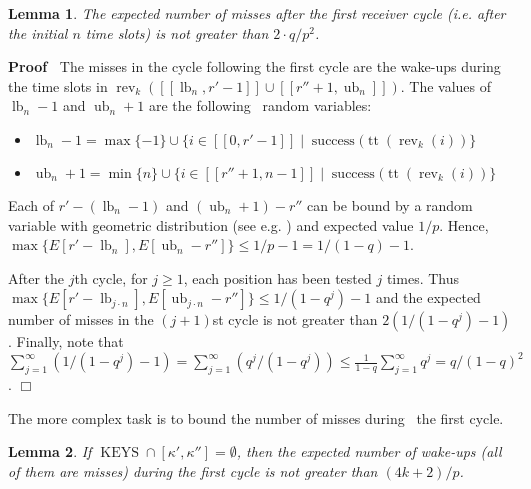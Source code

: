 \documentclass{article}
\newcommand{\tmop}[1]{\ensuremath{\operatorname{#1}}}
\newenvironment{proof}{\noindent\textbf{Proof\ }}{\hspace*{\fill}$\Box$\medskip}
\newtheorem{lemma}{Lemma}
\begin{document}
\begin{lemma}
  \label{Lemma-expected-trailer}The expected number of misses after the first
  receiver cycle (i.e. after the initial $n$ time slots) is not greater than
  $2 \cdot q / p^2$.
\end{lemma}

\begin{proof}
  The misses in the cycle following the first cycle are the wake-ups during
  the time slots in $\tmop{rev}_k ([[\tmop{lb}_n, r' - 1]] \cup [[r'' + 1,
  \tmop{ub}_n]])$. The values of $\tmop{lb}_n - 1$ and $\tmop{ub}_n + 1$ are
  the following \ random variables:
  \begin{itemize}
    \item $\tmop{lb}_n - 1 = \max \{- 1\} \cup \{i \in [[0, r' - 1]] \;|\;
    \tmop{success} (\tmop{tt} (\tmop{rev}_k (i))\}$
    
    \item $\tmop{ub}_n + 1 = \min \{n\} \cup \{i \in [[r'' + 1, n - 1]] \;|\;
    \tmop{success} (\tmop{tt} (\tmop{rev}_k (i))\}$
  \end{itemize}
  Each of $r' - (\tmop{lb}_n - 1)$ and $(\tmop{ub}_n + 1) - r''$ can be bound
  by a random variable with geometric distribution (see e.g.
  {\cite{CormenLR89}}) and expected value $1 / p$. Hence, \ $\max \{E [r' -
  \tmop{lb}_n], E [\tmop{ub}_n - r'']\} \leq 1 / p - 1 = 1 / (1 - q) - 1$.
  
  After the $j$th cycle, for $j \geq 1$, each position has been tested $j$
  times. Thus $\max \{E [r' - \tmop{lb}_{j \cdot n}], E [\tmop{ub}_{j \cdot n}
  - r'']\} \leq 1 / (1 - q^j) - 1$ and the expected number of misses in the
  $(j + 1)$st cycle is not greater than $2 (1 / (1 - q^j) - 1)$. Finally, note
  that $\sum_{j = 1}^{\infty} (1 / (1 - q^j) - 1) = \sum_{j = 1}^{\infty} (q^j
  / (1 - q^j)) \leq \frac{1}{1 - q}  \sum_{j = 1}^{\infty} q^j = q / (1 - q)^2
  $.
\end{proof}

The more complex task is to bound the number of misses during \ the first
cycle.

\begin{lemma}
  \label{Lemma-expected-init}If $\tmop{KEYS} \cap [\kappa', \kappa''] =
  \emptyset$, then the expected number of wake-ups (all of them are misses)
  during the first cycle is not greater than $(4 k + 2) / p$.
\end{lemma}
\end{document}
